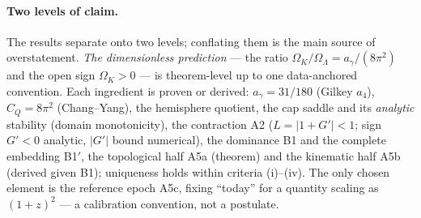 \documentclass[11pt,a4paper]{article}
\theoremstyle{plain}
\theoremstyle{definition}
\theoremstyle{remark}
\newcommand{\Ok}{\Omega_K}
\newcommand{\OL}{\Omega_\Lambda}
\newcommand{\ag}{a_\gamma}
\newcommand{\CQ}{C_Q}
\begin{document}
\paragraph{Two levels of claim.} The results separate onto two levels; conflating them is the main source of overstatement. \emph{The dimensionless prediction} --- the ratio
$\Ok/\OL = \ag/(8\pi^2)$ and the open sign $\Ok>0$ --- is theorem-level up to one data-anchored
convention. Each ingredient is proven or derived: $\ag = 31/180$ (Gilkey $a_4$), $\CQ = 8\pi^2$
(Chang--Yang), the hemisphere quotient, the cap saddle and its \emph{analytic} stability (domain
monotonicity), the contraction A2 ($L = |1+G'| < 1$; sign $G'<0$ analytic, $|G'|$ bound numerical), the dominance B1 and the complete
embedding B1$'$, the topological half A5a (theorem) and the kinematic half A5b (derived given
B1); uniqueness holds within criteria (i)--(iv). The only chosen element is the
reference epoch A5c, fixing ``today'' for a quantity scaling as $(1+z)^2$ --- a calibration
convention, not a postulate.
\end{document}
